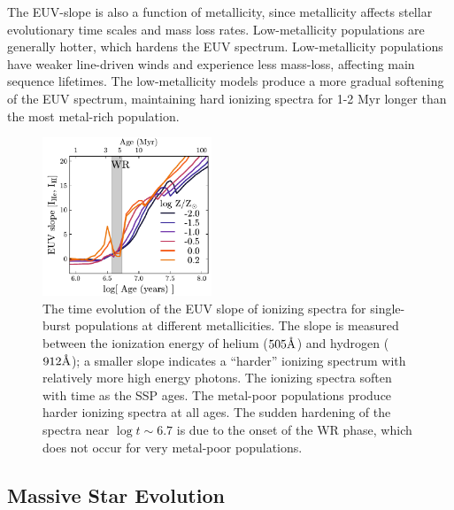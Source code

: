 The EUV-slope is also a function of metallicity, since metallicity affects stellar evolutionary time scales and mass loss rates. Low-metallicity populations are generally hotter, which hardens the EUV spectrum. Low-metallicity populations have weaker line-driven winds and experience less mass-loss, affecting main sequence lifetimes. The low-metallicity models produce a more gradual softening of the EUV spectrum, maintaining hard ionizing spectra for 1-2 Myr longer than the most metal-rich population. 
\begin{figure}[!htbp]
  \begin{centering}
    \includegraphics[width=0.45\textwidth]{manuscript/chapter2/f3.pdf}
    \caption{The time evolution of the EUV slope of ionizing spectra for single-burst populations at different metallicities. The slope is measured between the ionization energy of helium ($505\mbox{\AA}$) and hydrogen ($912\mbox{\AA}$); a smaller slope indicates a ``harder'' ionizing spectrum with relatively more high energy photons. The ionizing spectra soften with time as the SSP ages. The metal-poor populations produce harder ionizing spectra at all ages. The sudden hardening of the spectra near $\log t \sim 6.7$ is due to the onset of the WR phase, which does not occur for very metal-poor populations.}
    \label{fig:EUV}
  \end{centering}
\end{figure}

\subsection{Massive Star Evolution}\label{sec:spectra:stars}

